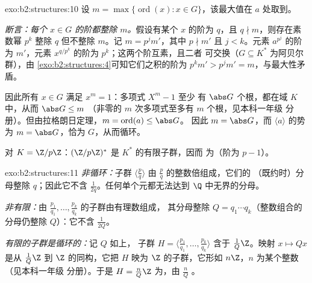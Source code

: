 \begin{solution}{exo:b2:structures:10}
设 $m = \max\{\operatorname{ord}(x) : x \in G\}$，该最大值在 $a$ 处取到。

\emph{断言：每个 $x \in G$ 的阶都整除 $m$。}假设有某个
$x$ 的阶为 $q$，且 $q \nmid m$，则存在素数幂 $p^k$
整除 $q$ 但不整除 $m$。记 $m = p^j m'$，其中 $p \nmid m'$ 且 $j
< k$。元素 $a^{p^j}$ 的阶为 $m'$，元素
$x^{q/p^k}$ 的阶为 $p^k$；这两个阶互素，且二者
可交换（$G \subseteq K^*$ 为阿贝尔群），由
\cref{exo:b2:structures:4}可知它们之积的阶为 $p^k m' > p^j m'
= m$，与最大性矛盾。

因此所有 $x \in G$ 满足 $x^m = 1$：多项式 $X^m - 1$ 至少
有 $\abs G$ 个根，都在域 $K$ 中，从而 $\abs G \leq m$
（非零的 $m$ 次多项式至多有 $m$ 个根，见本科一年级
分册）。但由拉格朗日定理，$m = \operatorname{ord}(a) \leq \abs G$。
因此 $m = \abs G$，而 $\langle a \rangle$ 的势为 $m =
\abs G$，恰为 $G$，从而循环。

对 $K = \Z/p\Z$：$(\Z/p\Z)^*$ 是 $K^*$ 的有限子群，因而
为（阶为 $p - 1$）。
\end{solution}

\begin{solution}{exo:b2:structures:11}
\emph{非循环：}子群 $\langle \frac pq\rangle$ 由
$\frac pq$ 的整数倍组成，它们的
（既约时）分母整除 $q$；因此它不含
$\frac{1}{2q}$。任何单个元都无法达到
$\Q$ 中无界的分母。

\emph{非有限：}由
$\frac{p_1}{q_1}, \dots, \frac{p_k}{q_k}$ 的子群由有理数组成，
其分母整除 $Q = q_1 \cdots q_k$（整数组合的
分母仍整除 $Q$）：它不含 $\frac{1}{2Q}$。

\emph{有限的子群是循环的：}记 $Q$ 如上，
子群 $H = \langle \frac{p_1}{q_1}, \dots,
\frac{p_k}{q_k}\rangle$ 含于 $\frac{1}{Q}\Z$。映射 $x
\mapsto Qx$ 是从 $\frac1Q\Z$ 到 $\Z$ 的同构，它把
$H$ 映为 $\Z$ 的子群，它形如 $n\Z$，$n$ 为某个整数（见本科一年级
分册）。于是 $H = \frac{n}{Q}\Z$ 为，由
$\frac nQ$ 。
\end{solution}

